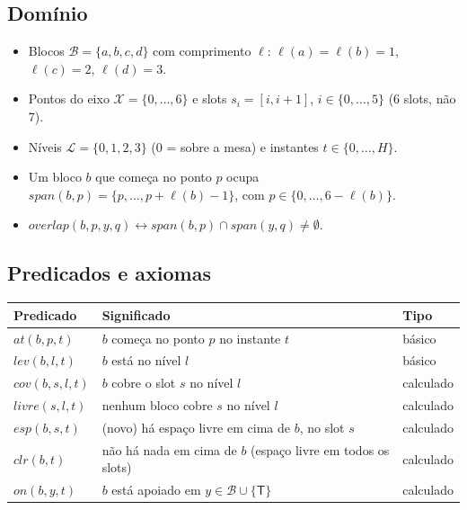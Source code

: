 \documentclass[11pt,a4paper]{article}
\newcommand{\clr}{\mathit{clr}}
\newcommand{\at}{\mathit{at}}
\newcommand{\lev}{\mathit{lev}}
\newcommand{\cov}{\mathit{cov}}
\newcommand{\livre}{\mathit{livre}}
\newcommand{\esp}{\mathit{esp}}
\newcommand{\on}{\mathit{on}}
\newcommand{\spn}{\mathit{span}}
\newcommand{\ov}{\mathit{overlap}}
\newcommand{\mesaT}{\mathsf{T}}
\begin{document}
\subsection{Domínio}
\begin{itemize}
  \item Blocos $\mathcal{B}=\{a,b,c,d\}$ com comprimento $\ell$:
        $\ell(a)=\ell(b)=1$, $\ell(c)=2$, $\ell(d)=3$.
  \item Pontos do eixo $\mathcal{X}=\{0,\dots,6\}$ e slots $s_i=[i,i+1]$,
        $i\in\{0,\dots,5\}$ (6 slots, não 7).
  \item Níveis $\mathcal{L}=\{0,1,2,3\}$ ($0$ = sobre a mesa) e instantes $t\in\{0,\dots,H\}$.
  \item Um bloco $b$ que começa no ponto $p$ ocupa
        $\spn(b,p)=\{p,\dots,p+\ell(b)-1\}$, com $p\in\{0,\dots,6-\ell(b)\}$.
  \item $\ov(b,p,y,q) \leftrightarrow \spn(b,p)\cap\spn(y,q)\neq\emptyset$.
\end{itemize}

\subsection{Predicados e axiomas}
\begin{center}
\begin{tabular}{@{}lll@{}}
\toprule
Predicado & Significado & Tipo\\
\midrule
$\at(b,p,t)$ & $b$ começa no ponto $p$ no instante $t$ & básico\\
$\lev(b,l,t)$ & $b$ está no nível $l$ & básico\\
$\cov(b,s,l,t)$ & $b$ cobre o slot $s$ no nível $l$ & calculado\\
$\livre(s,l,t)$ & nenhum bloco cobre $s$ no nível $l$ & calculado\\
$\esp(b,s,t)$ & (novo) há espaço livre em cima de $b$, no slot $s$ & calculado\\
$\clr(b,t)$ & não há nada em cima de $b$ (espaço livre em todos os slots) & calculado\\
$\on(b,y,t)$ & $b$ está apoiado em $y\in\mathcal{B}\cup\{\mesaT\}$ & calculado\\
\bottomrule
\end{tabular}
\end{center}
\end{document}
